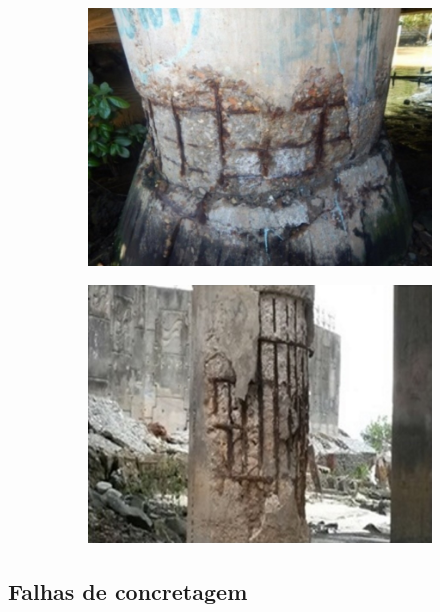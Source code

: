 \begin{figure}[htb]
\centering
\caption{Exemplos de corrosão de armadura em estruturas de concreto.}
    \begin{subfigure}{.5\textwidth}
      \centering
      \includegraphics[width=.8\linewidth]{images/corrosao_armadura01.jpg}
      \label{fig:corrosao01}
    \end{subfigure}%
    \begin{subfigure}{.5\textwidth}
      \centering
      \includegraphics[width=.8\linewidth]{images/corrosao02.jpg}
      \label{fig:corrosao02}
    \end{subfigure}

\label{fig:cor_armd}
\end{figure}
    
\subsection{Falhas de concretagem}
    

